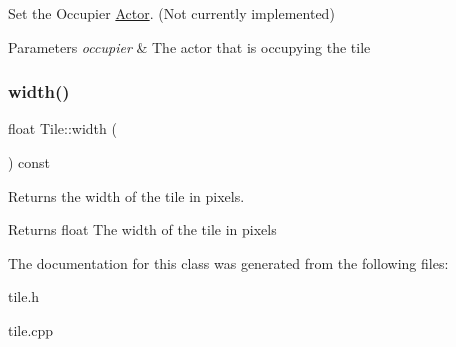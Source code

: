 Set the Occupier \mbox{\hyperlink{classActor}{Actor}}. (Not currently implemented) 


\begin{DoxyParams}{Parameters}
{\em occupier} & The actor that is occupying the tile \\
\hline
\end{DoxyParams}
\mbox{\label{classTile_a819194106af71d48f48d0fedfcccc31e}} 
\subsubsection{\texorpdfstring{width()}{width()}}
{\footnotesize\ttfamily float Tile\+::width (\begin{DoxyParamCaption}{ }\end{DoxyParamCaption}) const}



Returns the width of the tile in pixels. 

\begin{DoxyReturn}{Returns}
float The width of the tile in pixels 
\end{DoxyReturn}


The documentation for this class was generated from the following files\+:\begin{DoxyCompactItemize}
\item 
tile.\+h\item 
tile.\+cpp\end{DoxyCompactItemize}
